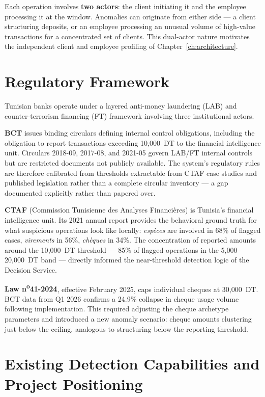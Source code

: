 Each operation involves \textbf{two actors}: the client initiating it and the employee processing it at the window. Anomalies can originate from either side --- a client structuring deposits, or an employee processing an unusual volume of high-value transactions for a concentrated set of clients. This dual-actor nature motivates the independent client and employee profiling of Chapter~\ref{ch:architecture}.

\section{Regulatory Framework}

Tunisian banks operate under a layered anti-money laundering (LAB) and counter-terrorism financing (FT) framework involving three institutional actors.

\textbf{BCT} issues binding circulars defining internal control obligations, including the obligation to report transactions exceeding 10{,}000~DT to the financial intelligence unit. Circulars 2018-09, 2017-08, and 2021-05 govern LAB/FT internal controls but are restricted documents not publicly available. The system's regulatory rules are therefore calibrated from thresholds extractable from CTAF case studies and published legislation rather than a complete circular inventory --- a gap documented explicitly rather than papered over.

\textbf{CTAF} (Commission Tunisienne des Analyses Financi\`eres) is Tunisia's financial intelligence unit. Its 2021 annual report provides the behavioral ground truth for what suspicious operations look like locally: \emph{esp\`eces} are involved in 68\% of flagged cases, \emph{virements} in 56\%, \emph{ch\`eques} in 34\%. The concentration of reported amounts around the 10{,}000~DT threshold --- 85\% of flagged operations in the 5{,}000--20{,}000~DT band --- directly informed the near-threshold detection logic of the Decision Service.

\textbf{Law n\textsuperscript{o}41-2024}, effective February 2025, caps individual cheques at 30{,}000~DT. BCT data from Q1 2026 confirms a 24.9\% collapse in cheque usage volume following implementation. This required adjusting the cheque archetype parameters and introduced a new anomaly scenario: cheque amounts clustering just below the ceiling, analogous to structuring below the reporting threshold.

\section{Existing Detection Capabilities and Project Positioning}

